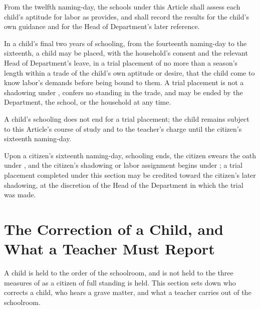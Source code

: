 \begin{clauses}
\item From the twelfth naming-day, the schools under this Article shall assess each child's aptitude for labor as  provides, and shall record the results for the child's own guidance and for the Head of Department's later reference.
\item In a child's final two years of schooling, from the fourteenth naming-day to the sixteenth, a child may be placed, with the household's consent and the relevant Head of Department's leave, in a trial placement of no more than a season's length within a trade of the child's own aptitude or desire, that the child come to know labor's demands before being bound to them. A trial placement is not a shadowing under , confers no standing in the trade, and may be ended by the Department, the school, or the household at any time.
\item A child's schooling does not end for a trial placement; the child remains subject to this Article's course of study and to the teacher's charge until the citizen's sixteenth naming-day.
\item Upon a citizen's sixteenth naming-day, schooling ends, the citizen swears the oath under , and the citizen's shadowing or labor assignment begins under ; a trial placement completed under this section may be credited toward the citizen's later shadowing, at the discretion of the Head of the Department in which the trial was made.
\end{clauses}

\section{The Correction of a Child, and What a Teacher Must Report}
\label{sec:schooling:correction-of-a-child}

A child is held to the order of the schoolroom, and is not held to the three measures of  as a citizen of full standing is held. This section sets down who corrects a child, who hears a grave matter, and what a teacher carries out of the schoolroom.

